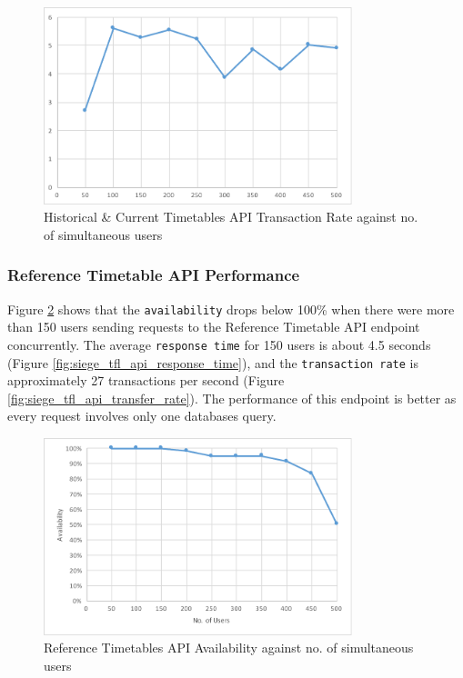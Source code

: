 \begin{figure}
\centering
\includegraphics[width=0.8\textwidth]{figures/siege_predictions_api_transfer_rate_against_users.pdf}
\caption{\label{fig:siege_pre_api_transfer_rate} Historical \& Current Timetables API Transaction Rate against no. of simultaneous users}
\end{figure}

\subsubsection{Reference Timetable API Performance}
\par Figure \ref{fig:siege_tfl_api_availability} shows that the \texttt{availability} drops below 100\% when there were more than 150 users sending requests to the Reference Timetable API endpoint concurrently. The average \texttt{response time} for 150 users is about 4.5 seconds (Figure \ref{fig:siege_tfl_api_response_time}), and the \texttt{transaction rate} is approximately 27 transactions per second (Figure \ref{fig:siege_tfl_api_transfer_rate}). The performance of this endpoint is better as every request involves only one databases query.

\begin{figure}
\centering
\includegraphics[width=0.8\textwidth]{figures/siege_tfl_api_availability_against_users.pdf}
\caption{\label{fig:siege_tfl_api_availability} Reference Timetables API Availability against no. of simultaneous users}
\end{figure}

